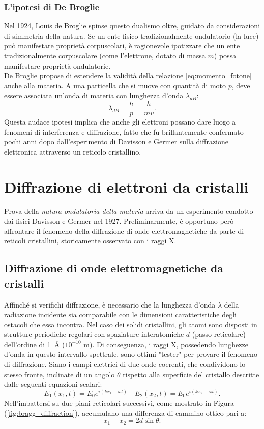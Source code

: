 \documentclass[a4paper,11pt]{report}
\begin{document}
\subsubsection{L'ipotesi di De Broglie}
Nel 1924, Louis de Broglie spinse questo dualismo oltre, guidato da considerazioni di simmetria della natura. Se un ente fisico tradizionalmente ondulatorio (la luce) può manifestare proprietà corpuscolari, è ragionevole ipotizzare che un ente tradizionalmente corpuscolare (come l'elettrone, dotato di massa $m$) possa manifestare proprietà ondulatorie. \\
De Broglie propose di estendere la validità della relazione \eqref{eq:momento_fotone} anche alla materia. A una particella che si muove con quantità di moto $p$, deve essere associata un'onda di materia con lunghezza d'onda $\lambda_{dB}$:
\begin{equation}
\lambda_{dB} = \frac{h}{p} = \frac{h}{mv}.
\end{equation}
Questa audace ipotesi implica che anche gli elettroni possano dare luogo a fenomeni di interferenza e diffrazione, fatto che fu brillantemente confermato pochi anni dopo dall'esperimento di Davisson e Germer sulla diffrazione elettronica attraverso un reticolo cristallino.


\section{Diffrazione di elettroni da cristalli}

Prova della \textit{natura ondulatoria della materia} arriva da un esperimento condotto dai fisici Davisson e Germer nel 1927. Preliminarmente, è opportuno però affrontare il fenomeno della diffrazione di onde elettromagnetiche da parte di reticoli cristallini, storicamente osservato con i raggi X.

\subsection{Diffrazione di onde elettromagnetiche da cristalli}
Affinché si verifichi diffrazione, è necessario che la lunghezza d'onda $\lambda$ della radiazione incidente sia comparabile con le dimensioni caratteristiche degli ostacoli che essa incontra. Nel caso dei solidi cristallini, gli atomi sono disposti in strutture periodiche regolari con spaziature interatomiche $d$ (passo reticolare) dell'ordine di \SI{1}{\angstrom} ($10^{-10}$ m).
Di conseguenza, i raggi X, possedendo lunghezze d'onda in questo intervallo spettrale, sono ottimi "tester" per provare il fenomeno di diffrazione. Siano i campi elettrici di due onde coerenti, che condividono lo stesso fronte, inclinate di un angolo $\theta$ rispetto alla superficie del cristallo descritte dalle seguenti equazioni scalari:
\begin{equation}
E_1(x_1,t) = E_0e^{i(kx_1-\omega t)} \quad E_2(x_2,t) = E_0e^{i(kx_2-\omega t)}.
\end{equation}
Nell'imbattersi su due piani reticolari successivi, come mostrato in Figura (\ref{fig:bragg_diffraction}), accumulano una differenza di cammino ottico pari a:
\begin{equation}
x_1 - x_2 = 2d\sin\theta.
\end{equation}
\end{document}
